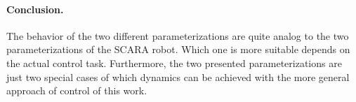 \paragraph*{Conclusion.}
The behavior of the two different parameterizations are quite analog to the two parameterizations of the SCARA robot.
Which one is more suitable depends on the actual control task.
Furthermore, the two presented parameterizations are just two special cases of which dynamics can be achieved with the more general approach of control of this work. 

